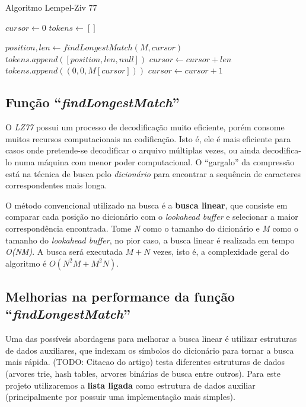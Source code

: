 \begin{algorithm}[H]
\caption{Algoritmo Lempel-Ziv 77} \label{alg:lz77}
\begin{algorithmic}

	\State $cursor \gets 0$
	\State $tokens \gets []$

		\State $position, len \gets findLongestMatch(M, cursor)$ 
		 
			\State $tokens.append([position, len, null])$
			\State $cursor \gets cursor + len$
		\Else
			\State $tokens.append((0, 0, M[cursor]))$ 
			\State $cursor \gets cursor + 1$
		\EndIf
	\EndWhile
\end{algorithmic}
\end{algorithm}

\subsection{Função ``\emph{findLongestMatch}'' }
O \emph{LZ77} possui um processo de decodificação muito eficiente, porém consome muitos recursos computacionais na codificação. 
Isto é, ele é mais eficiente para casos onde pretende-se decodificar o arquivo múltiplas vezes, ou ainda decodifica-lo numa máquina com menor poder computacional. 
O ``gargalo'' da compressão está na técnica de busca pelo \emph{dicionário} para encontrar a sequência de caracteres correspondentes mais longa.

O método convencional utilizado na busca é a \textbf{busca linear}, que consiste em comparar cada posição no dicionário com o \emph{lookahead buffer} e selecionar a maior correspondência encontrada. 
Tome \emph{N} como o tamanho do dicionário e \emph{M} como o tamanho do \emph{lookahead buffer}, no pior caso, a busca linear é realizada em tempo \emph{O(NM)}. 
A busca será executada $M + N$ vezes, isto é, a complexidade geral do algoritmo é $O( N^{2}M + M^{2}N)$.

\subsection{Melhorias na performance da função ``\emph{findLongestMatch}'' }

Uma das possíveis abordagens para melhorar a busca linear é utilizar estruturas de dados auxiliares, que indexam os símbolos do dicionário para tornar a busca mais rápida.
(TODO: Citacao do artigo) testa diferentes estruturas de dados (arvores trie, hash tables, arvores binárias de busca entre outros). 
Para este projeto utilizaremos a \textbf{lista ligada} como estrutura de dados auxiliar (principalmente por possuir uma implementação mais simples). 

